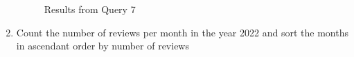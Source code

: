 \documentclass{Configuration_Files/PoliMi3i_thesis}
\begin{document}
\begin{enumerate}
\begin{verbatim}
    \end{verbatim}


\begin{figure}[H]
    \centering
    \quad
        \caption{Results from Query 7}

\end{figure}

    \item Count the number of reviews per month in the year 2022 and sort the months in ascendant order by number of reviews


\end{enumerate}
\end{document}
